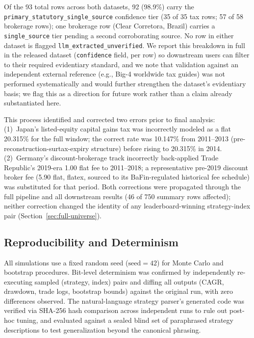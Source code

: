 \documentclass[11pt]{article}
\begin{document}
Of the 93 total rows across both datasets, 92 (98.9\%) carry the \texttt{primary\_statutory\_single\_source} confidence tier (35 of 35 tax rows; 57 of 58 brokerage rows); one brokerage row (Clear Corretora, Brazil) carries a \texttt{single\_source} tier pending a second corroborating source. No row in either dataset is flagged \texttt{llm\_extracted\_unverified}. We report this breakdown in full in the released dataset (\texttt{confidence} field, per row) so downstream users can filter to their required evidentiary standard, and we note that validation against an independent external reference (e.g., Big-4 worldwide tax guides) was not performed systematically and would further strengthen the dataset's evidentiary basis; we flag this as a direction for future work rather than a claim already substantiated here.

This process identified and corrected two errors prior to final analysis: (1)~Japan's listed-equity capital gains tax was incorrectly modeled as a flat 20.315\% for the full window; the correct rate was 10.147\% from 2011--2013 (pre-reconstruction-surtax-expiry structure) before rising to 20.315\% in 2014. (2)~Germany's discount-brokerage track incorrectly back-applied Trade Republic's 2019-era \texteuro{}1.00 flat fee to 2011--2018; a representative pre-2019 discount broker fee (\texteuro{}5.90 flat, flatex, sourced to its BaFin-regulated historical fee schedule) was substituted for that period. Both corrections were propagated through the full pipeline and all downstream results (46 of 750 summary rows affected); neither correction changed the identity of any leaderboard-winning strategy-index pair (Section~\ref{sec:full-universe}).

\subsection{Reproducibility and Determinism}
\label{sec:reproducibility}

All simulations use a fixed random seed ($\mathrm{seed}=42$) for Monte Carlo and bootstrap procedures. Bit-level determinism was confirmed by independently re-executing sampled (strategy, index) pairs and diffing all outputs (CAGR, drawdown, trade logs, bootstrap bounds) against the original run, with zero differences observed. The natural-language strategy parser's generated code was verified via SHA-256 hash comparison across independent runs to rule out post-hoc tuning, and evaluated against a sealed blind set of paraphrased strategy descriptions to test generalization beyond the canonical phrasing.
\end{document}
